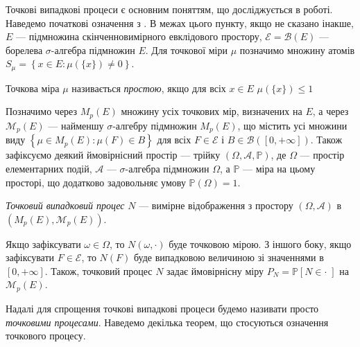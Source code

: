 Точкові випадкові процеси є основним поняттям, що досліджується в роботі.
Наведемо початкові означення з \cite{Resnick_1987}.
В межах цього пункту, якщо не сказано інакше,
$E$ --- підмножина скінченновимірного евклідового простору,
$\mathcal{E} = \mathcal{B}(E)$ --- борелева $\sigma$-алгебра підмножин $E$.
Для точкової міри $\mu$ позначимо множину атомів 
$S_\mu = \left\{x \in E : \mu\left(\{x\}\right) \neq 0\right\}$.
\begin{definition}
    Точкова міра $\mu$ називається \emph{простою},
    якщо для всіх $x \in E$ $\mu\left(\{x\}\right) \leq 1$
\end{definition}
Позначимо через $M_p(E)$ множину усіх точкових мір, визначених на $E$,
а через $\mathcal{M}_p(E)$ --- найменшу $\sigma$-алгебру
підмножин $M_p(E)$, що містить усі множини виду
$\left\{
    \mu \in M_p(E) : \mu(F) \in B
\right\}$ для всіх $F \in \mathcal{E}$ і $B \in \mathcal{B}\left([0, +\infty]\right)$.
Також зафіксуємо деякий ймовірнісний простір --- трійку
$\left(\Omega, \mathcal{A}, \mathbb{P}\right)$, де
$\Omega$ --- простір елементарних подій, $\mathcal{A}$ ---
$\sigma$-алгебра підмножин $\Omega$, а $\mathbb{P}$ --- міра на цьому просторі,
що додатково задовольняє умову $\mathbb{P}\left(\Omega\right) = 1$.
\begin{definition} 
    \emph{Точковий випадковий процес} $N$ --- вимірне відображення
    з простору $\left(\Omega, \mathcal{A}\right)$
    в $\left(M_p(E), \mathcal{M}_p(E)\right)$.
\end{definition}
Якщо зафіксувати $\omega \in \Omega$, то $N(\omega, \cdot)$
буде точковою мірою. З іншого боку, якщо зафіксувати $F \in \mathcal{E}$,
то $N(F)$ буде випадковою величиною зі значеннями в $[0, +\infty]$.
Також, точковий процес $N$ задає ймовірнісну міру 
$P_N = \mathbb{P}\left[N \in \cdot \; \right]$
на $\mathcal{M}_p(E)$.

Надалі для спрощення точкові випадкові процеси
будемо називати просто \emph{точковими процесами}. Наведемо
декілька теорем, що стосуються означення точкового процесу.


